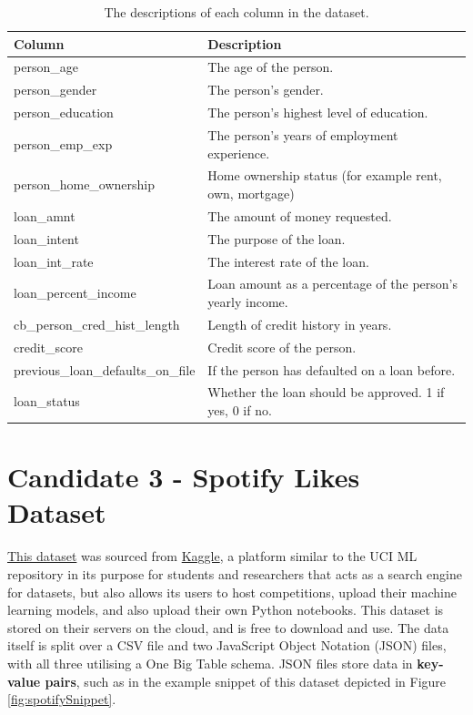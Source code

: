 \documentclass[12pt]{report}
\begin{document}
\begin{table}[H]
    \centering
        \begin{tabular}{ |p{}| p{}|}
            \hline
            \cellcolor{blue!25}Column & \cellcolor{blue!25}Description\\
            \hline
            person\_age & The age of the person.\\
            \hline
            person\_gender & The person's gender.\\
            \hline
            person\_education & The person's highest level of education.\\
            \hline
            person\_emp\_exp & The person's years of employment experience.\\
            \hline
            person\_home\_ownership & Home ownership status (for example rent, own, mortgage)\\
            \hline
            loan\_amnt & The amount of money requested.\\
            \hline
            loan\_intent & The purpose of the loan.\\
            \hline
            loan\_int\_rate & The interest rate of the loan.\\
            \hline
            loan\_percent\_income & Loan amount as a percentage of the person's yearly income.\\
            \hline
            cb\_person\_cred\_hist\_length & Length of credit history in years.\\
            \hline
            credit\_score & Credit score of the person.\\
            \hline
            previous\_loan\_defaults\_on\_file & If the person has defaulted on a loan before. \\
            \hline
            loan\_status & Whether the loan should be approved. 1 if yes, 0 if no.\\
            \hline
    \end{tabular}
    \caption{The descriptions of each column in the dataset.}\label{tab:Loan-Types}
\end{table}

\pagebreak

\section{Candidate 3 - Spotify Likes Dataset}
\href{https://www.kaggle.com/datasets/bricevergnou/spotify-recommendation/data}{This dataset} was sourced from \href{https://www.kaggle.com/datasets}{Kaggle}, a platform similar to the UCI ML repository in its purpose for students and researchers
that acts as a search engine for datasets, but also allows its users to host competitions, upload their machine learning models, and also upload 
their own Python notebooks. This dataset is stored on their servers on the cloud, and is free to download and use. The data itself is split over 
a CSV file and two JavaScript Object Notation (JSON) files, with all three utilising a One Big Table schema. JSON files 
store data in \textbf{key-value pairs}, such as in the example snippet of this dataset depicted in Figure \ref{fig:spotifySnippet}.  
\end{document}
